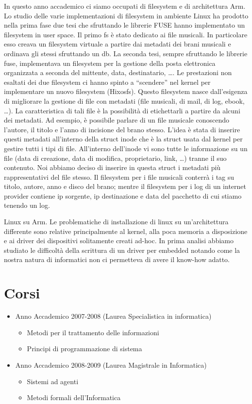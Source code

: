 \documentclass[a4paper,12pt]{article}
\newcommand{\ua }{\`{u} }
\renewcommand{\aa }{\`{a} }
\newcommand{\ea }{\`{e} }
\begin{document}
In questo anno accademico ci siamo occupati di filesystem e di architettura Arm.
Lo studio delle varie implementazioni di filesystem in ambiente Linux ha prodotto nella prima fase due tesi che sfruttando le librerie FUSE hanno implementato un filesystem in user space.
Il primo fs \ea stato dedicato ai file musicali. In particolare esso creava un filesystem virtuale a partire dai metadati dei brani musicali e ordinava gli stessi sfruttando un db. La seconda tesi, sempre sfruttando le librerie fuse, implementava un filesystem per la gestione della posta elettronica organizzata a seconda del mittente, data, destinatario, \dots.
Le prestazioni non esaltati dei due filesystem ci hanno spinto a ``scendere'' nel kernel per implementare un nuovo filesystem (Hixosfs). Questo filesystem nasce dall'esigenza di migliorare la gestione di file con metadati (file musicali, di mail, di log, ebook, \dots). La caratteristica di tali file \ea la possibilit\aa di etichettarli a partire da alcuni dei metadati. Ad esempio, \ea possibile parlare di un file musicale conoscendo l'autore, il titolo e l'anno di incisione del brano stesso. L'idea \ea stata di inserire questi metadati all'interno della struct inode che \ea la struct usata dal kernel per gestire tutti i tipi di file. All'interno dell'inode vi sono tutte le informazione su un file (data di creazione, data di modifica, proprietario, link, \dots) tranne il suo contenuto. Noi abbiamo deciso di inserire in questa struct i metadati pi\ua rappresentativi del file stesso. Il filesystem per i file musicali conterr\aa i tag su titolo, autore, anno e disco del brano; mentre il filesystem per i log di un internet provider contiene ip sorgente, ip destinazione e data del pacchetto di cui stiamo tenendo un log.


Linux su Arm.
Le problematiche di installazione di linux su un'architettura differente sono relative principalmente al kernel, alla poca memoria a disposizione e ai driver dei dispositivi solitamente creati ad-hoc. In prima analisi abbiamo studiato le difficolt\aa della scrittura di un driver per embedded notando come la nostra natura di informatici non ci permetteva di avere il know-how adatto.

\section*{Corsi}
\begin{itemize}
\item Anno Accademico 2007-2008 (Laurea Specialistica in informatica)
\begin{itemize}
 \item Metodi per il trattamento delle informazioni
\item Principi di programmazione di sistema
\end{itemize}
\item Anno Accademico 2008-2009 (Laurea Magistrale in Informatica)
\begin{itemize}
\item Sistemi ad agenti
\item Metodi formali dell'Informatica
\end{itemize}

\end{itemize}
\end{document}
